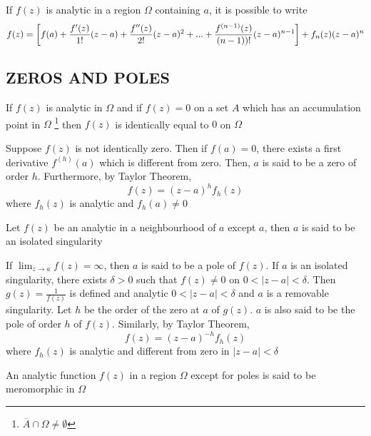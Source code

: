 \documentclass{report}
\begin{document}
\begin{theorem}
    If $f(z)$ is analytic in a region $\Omega$ containing $a$, it is possible to write
    \[
        f(z) = \bracket*{f(a) + \frac{f'(z)}{1!}(z-a) + \frac{f''(z)}{2!}(z-a)^2 + ... + \frac{f^{(n-1)}(z)}{(n-1))!}(z-a)^{n-1}} + f_n(z)(z-a)^n
    \]
\end{theorem}

\subsection{ZEROS AND POLES}

\begin{proposition}
    If $f(z)$ is analytic in $\Omega$ and if $f(z) = 0$ on a set $A$ which has an accumulation point in $\Omega$ \footnote{$\overline{A} \cap \Omega \neq \emptyset$} then $f(z)$ is identically equal to $0$ on $\Omega$
\end{proposition} 

\begin{proposition}[Zeros]
    Suppose $f(z)$ is not identically zero. Then if $f(a) = 0$, there exists a first derivative $f^{(h)}(a)$ which is different from zero. Then, $a$ is said to be a zero of order $h$. Furthermore, by Taylor Theorem,
    \[
        f(z) = (z - a)^h f_h(z) 
    \]
    where $f_h(z)$ is analytic and $f_h(a) \neq 0$
\end{proposition}

\begin{definition}
    Let $f(z)$ be an analytic in a neighbourhood of $a$ except $a$, then $a$ is said to be an isolated singularity
\end{definition}

\begin{proposition}[Poles]
    If $\lim_{z \to a} f(z) = \infty$, then $a$ is said to be a pole of $f(z)$. If $a$ is an isolated singularity, there exists $\delta > 0$ such that $f(z) \neq 0$ on $0 < |z - a| < \delta$. Then $g(z) = \frac{1}{f(z)}$ is defined and analytic $0 < |z - a| < \delta$ and $a$ is a removable singularity. Let $h$ be the order of the zero at $a$ of $g(z)$. $a$ is also said to be the pole of order $h$ of $f(z)$. Similarly, by Taylor Theorem,
    \[
        f(z) = (z - a)^{-h} f_h(z)
    \]
    where $f_h(z)$ is analytic and different from zero in $|z - a| < \delta$
\end{proposition}

\begin{definition}[Meromorphic]
    An analytic function $f(z)$ in a region $\Omega$ except for poles is said to be meromorphic in $\Omega$
\end{definition}
\end{document}
